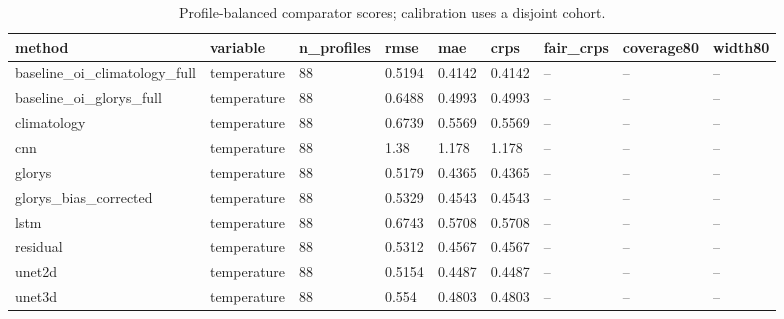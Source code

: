 \begin{table}[htbp]
\centering
\caption{Profile-balanced comparator scores; calibration uses a disjoint cohort.}
\begin{tabular}{lllllllll}
\toprule
method & variable & n\_profiles & rmse & mae & crps & fair\_crps & coverage80 & width80 \\
\midrule
baseline\_oi\_climatology\_full & temperature & 88 & 0.5194 & 0.4142 & 0.4142 & -- & -- & -- \\
baseline\_oi\_glorys\_full & temperature & 88 & 0.6488 & 0.4993 & 0.4993 & -- & -- & -- \\
climatology & temperature & 88 & 0.6739 & 0.5569 & 0.5569 & -- & -- & -- \\
cnn & temperature & 88 & 1.38 & 1.178 & 1.178 & -- & -- & -- \\
glorys & temperature & 88 & 0.5179 & 0.4365 & 0.4365 & -- & -- & -- \\
glorys\_bias\_corrected & temperature & 88 & 0.5329 & 0.4543 & 0.4543 & -- & -- & -- \\
lstm & temperature & 88 & 0.6743 & 0.5708 & 0.5708 & -- & -- & -- \\
residual & temperature & 88 & 0.5312 & 0.4567 & 0.4567 & -- & -- & -- \\
unet2d & temperature & 88 & 0.5154 & 0.4487 & 0.4487 & -- & -- & -- \\
unet3d & temperature & 88 & 0.554 & 0.4803 & 0.4803 & -- & -- & -- \\
\bottomrule
\end{tabular}
\end{table}
